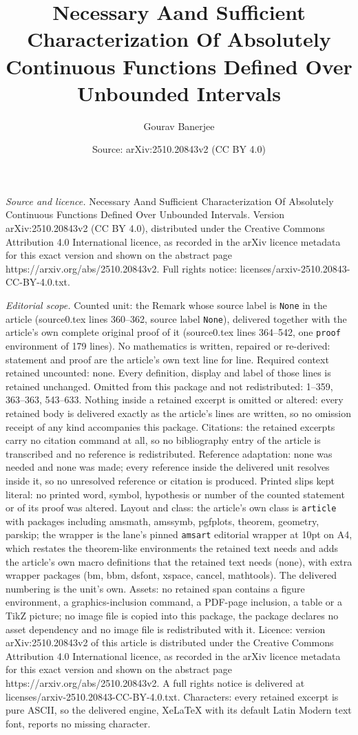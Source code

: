 \documentclass[10pt,a4paper]{amsart}
\title[Necessary Aand Sufficient Characterization Of Absolutely Con]{Necessary Aand Sufficient Characterization Of Absolutely Continuous Functions Defined Over Unbounded Intervals}
\author{Gourav Banerjee}
\date{Source: arXiv:2510.20843v2 (CC BY 4.0)}
\begin{document}
\maketitle

\noindent\emph{Source and licence.} Necessary Aand Sufficient Characterization Of Absolutely Continuous Functions Defined Over Unbounded Intervals. Version arXiv:2510.20843v2 (CC BY 4.0), distributed under the Creative Commons Attribution 4.0 International licence, as recorded in the arXiv licence metadata for this exact version and shown on the abstract page https://arxiv.org/abs/2510.20843v2. Full rights notice: licenses/arxiv-2510.20843-CC-BY-4.0.txt.\par\smallskip

\noindent\textit{Editorial scope.} Counted unit: the Remark whose source label is \texttt{None} in the article (source0.tex lines 360--362, source label \texttt{None}), delivered together with the article's own complete original proof of it (source0.tex lines 364--542, one \texttt{proof} environment of 179 lines). No mathematics is written, repaired or re-derived: statement and proof are the article's own text line for line. Required context retained uncounted: none. Every definition, display and label of those lines is retained unchanged. Omitted from this package and not redistributed: 1--359, 363--363, 543--633. Nothing inside a retained excerpt is omitted or altered: every retained body is delivered exactly as the article's lines are written, so no omission receipt of any kind accompanies this package. Citations: the retained excerpts carry no citation command at all, so no bibliography entry of the article is transcribed and no reference is redistributed. Reference adaptation: none was needed and none was made; every reference inside the delivered unit resolves inside it, so no unresolved reference or citation is produced. Printed slips kept literal: no printed word, symbol, hypothesis or number of the counted statement or of its proof was altered. Layout and class: the article's own class is \texttt{article} with packages including amsmath, amssymb, pgfplots, theorem, geometry, parskip; the wrapper is the lane's pinned \texttt{amsart} editorial wrapper at 10pt on A4, which restates the theorem-like environments the retained text needs and adds the article's own macro definitions that the retained text needs (none), with extra wrapper packages (bm, bbm, dsfont, xspace, cancel, mathtools). The delivered numbering is the unit's own. Assets: no retained span contains a figure environment, a graphics-inclusion command, a PDF-page inclusion, a table or a TikZ picture; no image file is copied into this package, the package declares no asset dependency and no image file is redistributed with it. Licence: version arXiv:2510.20843v2 of this article is distributed under the Creative Commons Attribution 4.0 International licence, as recorded in the arXiv licence metadata for this exact version and shown on the abstract page https://arxiv.org/abs/2510.20843v2. A full rights notice is delivered at licenses/arxiv-2510.20843-CC-BY-4.0.txt. Characters: every retained excerpt is pure ASCII, so the delivered engine, XeLaTeX with its default Latin Modern text font, reports no missing character.
\end{document}
